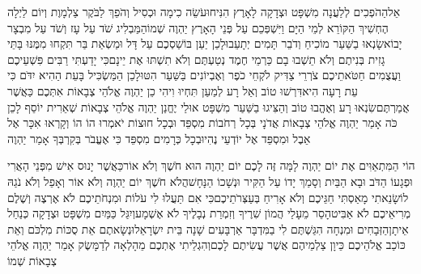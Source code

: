 \documentclass[../main/main.tex]{subfiles}
\begin{document}
\begin{multicols*}{\ncols}
אֵל\PreVerseSpace{}הַהֹפְכִים לְלַעֲנָה מִשְׁפָּט וּצְדָקָה לָאָרֶץ הִנִּיחוּ\PreVerseSpace{}עֹשֵׂה כִימָה וּכְסִיל וְהֹפֵךְ לַבֹּקֶר צַלְמָוֶת וְיוֹם לַיְלָה הֶחְשִׁיךְ הַקּוֹרֵא לְמֵי הַיָּם וַיִּשְׁפְּכֵם עַל פְּנֵי הָאָרֶץ יַהְוֶה שְׁמוֹ\PreVerseSpace{}הַמַּבְלִיג שֹׁד עַל עָז וְשֹׁד עַל מִבְצָר יָבוֹא\PreVerseSpace{}שָׂנְאוּ בַשַּׁעַר מוֹכִיחַ וְדֹבֵר תָּמִים יְתָעֵבוּ\PreVerseSpace{}לָכֵן יַעַן בּוֹשַׁסְכֶם עַל דָּל וּמַשְׂאַת בַּר תִּקְחוּ מִמֶּנּוּ בָּתֵּי גָזִית בְּנִיתֶם וְלֹא תֵשְׁבוּ בָם כַּרְמֵי חֶמֶד נְטַעְתֶּם וְלֹא תִשְׁתּוּ אֶת יֵינָם\PreVerseSpace{}כִּי יָדַעְתִּי רַבִּים פִּשְׁעֵיכֶם וַעֲצֻמִים חַטֹּאתֵיכֶם צֹרְרֵי צַדִּיק לֹקְחֵי כֹפֶר וְאֶבְיוֹנִים בַּשַּׁעַר הִטּוּ\PreVerseSpace{}לָכֵן הַמַּשְׂכִּיל בָּעֵת הַהִיא יִדֹּם כִּי עֵת רָעָה הִיא\PreVerseSpace{}דִּרְשׁוּ טוֹב וְאַל רָע לְמַעַן תִּחְיוּ וִיהִי כֵן יַהְוֶה אֱלֹהֵי צְבָאוֹת אִתְּכֶם כַּאֲשֶׁר אֲמַרְתֶּם\PreVerseSpace{}שִׂנְאוּ רָע וְאֶהֱבוּ טוֹב וְהַצִּיגוּ בַשַּׁעַר מִשְׁפָּט אוּלַי יֶחֱנַן יַהְוֶה אֱלֹהֵי צְבָאוֹת שְׁאֵרִית יוֹסֵף \ClosedSection{}לָכֵן כֹּה אָמַר יַהְוֶה אֱלֹהֵי צְבָאוֹת אֲדֹנָי בְּכָל רְחֹבוֹת מִסְפֵּד וּבְכָל חוּצוֹת יֹאמְרוּ הוֹ הוֹ וְקָרְאוּ אִכָּר אֶל אֵבֶל וּמִסְפֵּד אֶל יוֹדְעֵי נֶהִי\PreVerseSpace{}וּבְכָל כְּרָמִים מִסְפֵּד כִּי אֶעֱבֹר בְּקִרְבְּךָ אָמַר יַהְוֶה\OpenSection{}\par
{}הוֹי הַמִּתְאַוִּים אֶת יוֹם יַהְוֶה לָמָּה זֶּה לָכֶם יוֹם יַהְוֶה הוּא חֹשֶׁךְ וְלֹא אוֹר\PreVerseSpace{}כַּאֲשֶׁר יָנוּס אִישׁ מִפְּנֵי הָאֲרִי וּפְגָעוֹ הַדֹּב וּבָא הַבַּיִת וְסָמַךְ יָדוֹ עַל הַקִּיר וּנְשָׁכוֹ הַנָּחָשׁ\PreVerseSpace{}הֲלֹא חֹשֶׁךְ יוֹם יַהְוֶה וְלֹא אוֹר וְאָפֵל וְלֹא נֹגַהּ לוֹ\PreVerseSpace{}שָׂנֵאתִי מָאַסְתִּי חַגֵּיכֶם וְלֹא אָרִיחַ בְּעַצְּרֹתֵיכֶם\PreVerseSpace{}כִּי אִם תַּעֲלוּ לִי עֹלוֹת וּמִנְחֹתֵיכֶם לֹא אֶרְצֶה וְשֶׁלֶם מְרִיאֵיכֶם לֹא אַבִּיט\PreVerseSpace{}הָסֵר מֵעָלַי הֲמוֹן שִׁרֶיךָ וְזִמְרַת נְבָלֶיךָ לֹא אֶשְׁמָע\PreVerseSpace{}וְיִגַּל כַּמַּיִם מִשְׁפָּט וּצְדָקָה כְּנַחַל אֵיתָן\PreVerseSpace{}הַזְּבָחִים וּמִנְחָה הִגַּשְׁתֶּם לִי בַמִּדְבָּר אַרְבָּעִים שָׁנָה בֵּית יִשְׂרָאֵל\PreVerseSpace{}וּנְשָׂאתֶם אֵת סֻכּוֹת\SubEnd{} מִלְכֹּם\SubEnd{} וְאֵת כּוֹכַב אֱלֹהֵיכֶם כֵּיוָן צַלְמֵיהֶם\SubEnd{} אֲשֶׁר עֲשִׂיתֶם לָכֶם\PreVerseSpace{}וְהִגְלֵיתִי אֶתְכֶם מֵהָלְאָה לְדַמָּשֶׂק אָמַר יַהְוֶה אֱלֹהֵי צְבָאוֹת שְׁמוֹ\OpenSection{}\par

\end{multicols*}
\end{document}
